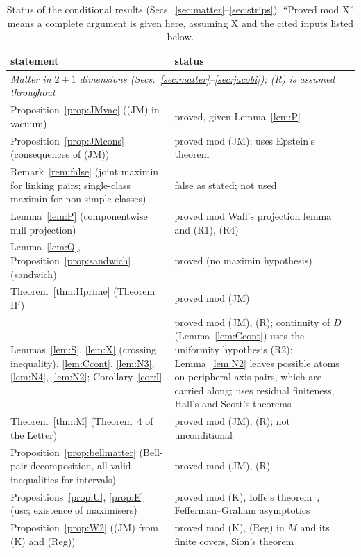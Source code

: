 \documentclass[aps,prd,onecolumn,superscriptaddress,nofootinbib,amsmath,amssymb,11pt]{revtex4-2}
\theoremstyle{definition}
\begin{document}
\begin{table}[h]
\caption{Status of the conditional results (Secs.~\ref{sec:matter}--\ref{sec:strips}). ``Proved mod X'' means a complete argument is
given here, assuming X and the cited inputs listed below.}
\label{tab:status2}
\begin{ruledtabular}
\begin{tabular}{p{}p{}}
statement & status\\
\hline
\multicolumn{2}{l}{\emph{Matter in $2+1$ dimensions (Secs.~\ref{sec:matter}--\ref{sec:jacobi}); (R) is assumed throughout}}\\
Proposition~\ref{prop:JMvac} ((JM) in vacuum) & proved, given Lemma~\ref{lem:P}\\
Proposition~\ref{prop:JMcons} (consequences of (JM)) & proved mod (JM); uses Epstein's theorem~\cite{Epstein1966}\\
Remark~\ref{rem:false} (joint maximin for linking pairs; single-class maximin for non-simple classes) & false as stated; not used\\
Lemma~\ref{lem:P} (componentwise null projection) & proved mod Wall's projection lemma~\cite{Wall2014} and (R1), (R4)\\
Lemma~\ref{lem:Q}, Proposition~\ref{prop:sandwich} (sandwich) & proved (no maximin hypothesis)\\
Theorem~\ref{thm:Hprime} (Theorem H$'$) & proved mod (JM)\\
Lemmas~\ref{lem:S}, \ref{lem:X} (crossing inequality), \ref{lem:Ccont}, \ref{lem:N3}, \ref{lem:N4}, \ref{lem:N2}; Corollary~\ref{cor:I} & proved mod (JM), (R); continuity of $D$ (Lemma~\ref{lem:Ccont}) uses the uniformity hypothesis (R2); Lemma~\ref{lem:N2} leaves possible atoms on peripheral axis pairs, which are carried along; uses residual finiteness, Hall's and Scott's theorems~\cite{Hall1949,Scott1978}\\
Theorem~\ref{thm:M} (Theorem~4 of the Letter) & proved mod (JM), (R); not unconditional\\
Proposition~\ref{prop:bellmatter} (Bell-pair decomposition, all valid inequalities for intervals) & proved mod (JM), (R)\\
Propositions~\ref{prop:U}, \ref{prop:E} (usc; existence of maximisers) & proved mod (K), Ioffe's theorem~\cite{Ioffe1977}, Fefferman--Graham asymptotics\\
Proposition~\ref{prop:W2} ((JM) from (K) and (Reg)) & proved mod (K), (Reg) in $M$ and its finite covers, Sion's theorem~\cite{Sion1958}\\

\end{tabular}
\end{ruledtabular}
\end{table}
\end{document}
